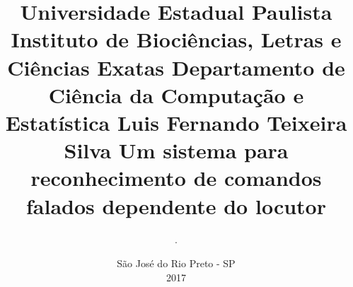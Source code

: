 \documentclass[a4paper,12pt,twoside,openright]{report}
\begin{document}
\titlespacing{\section}{0cm}{1.5cm}{1.5cm}
\titlespacing{\subsection}{0cm}{1.5cm}{1.5cm}

\title{
	\vspace*{-120pt}
	\hspace*{+55pt}Universidade Estadual Paulista
	\newline
	\hspace*{+45pt}Instituto de Bioci\^{e}ncias, Letras e Ci\^{e}ncias Exatas
	\newline
	\hspace*{+30pt}Departamento de Ci\^{e}ncia da Computa\c{c}\~{a}o e Estat\'{i}stica
	\newline
	\newline
	\newline
	\hspace*{+50pt}Luis Fernando Teixeira Silva
	\newline
	\newline
	\newline
	Um sistema para reconhecimento de comandos falados dependente do locutor
}

\author{{\tiny .}}
\date{\vspace*{+60pt}S\~{a}o Jos\'{e} do Rio Preto - SP \\ 2017}
\maketitle

\newpage\
\thispagestyle{empty}
\end{document}
